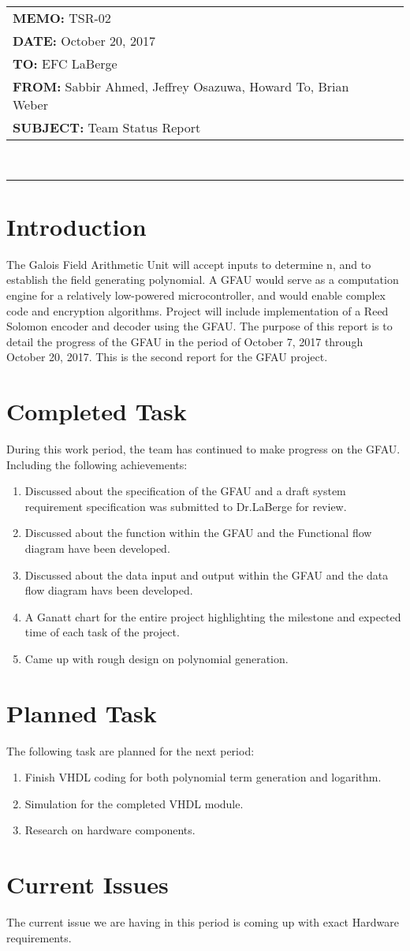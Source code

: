 \documentclass[paper=usletter, fontsize=12pt]{article}
\newcommand{\Sabbir}{Sabbir Ahmed}
\newcommand{\Jeffrey}{Jeffrey Osazuwa}
\newcommand{\Howard}{Howard To}
\newcommand{\Brian}{Brian Weber}
\newcommand{\documentinfo}[5]{
    \begin{centering}
        \parbox{6.8in}{
        \begin{spacing}{1}
            \begin{flushleft}
                \begin{tabular}{l l}
                    #1 \\
                    #2 \\
                    #3 \\
                    #4 \\
                    #5 \\
                \end{tabular} \\
                \rule{\textwidth}{1pt}
            \end{flushleft}
        \end{spacing}
        }
    \end{centering}
}
\begin{document}
\documentinfo{\textbf{MEMO:} TSR-02}{\textbf{DATE: }October 20, 2017}{\textbf{TO: } EFC LaBerge}{\textbf{FROM: }\Sabbir, \Jeffrey, \Howard, \Brian}{\textbf{SUBJECT: } Team Status Report}


\section{Introduction}

The Galois Field Arithmetic Unit will accept inputs to determine n, and to establish the field generating polynomial. A GFAU would serve as a computation engine for a relatively low-powered microcontroller, and would enable complex code and encryption algorithms. Project will include implementation of a Reed Solomon encoder and decoder using the GFAU. The purpose of this report is to detail the progress of the GFAU in the period of October 7, 2017 through October 20, 2017. This is the second report for the GFAU project. 


\section{Completed Task}

During this work period, the team has continued to make progress on the GFAU. Including the following achievements: 

\begin{enumerate}
	\item Discussed about the specification of the GFAU and a draft system requirement specification was submitted to Dr.LaBerge for review.
	\item Discussed about the function within the GFAU and the Functional flow diagram have been developed.
	\item Discussed about the data input and output within the GFAU and the data flow diagram havs been developed.
	\item A Ganatt chart for the entire project highlighting the milestone and expected time of each task of the project.   
	\item Came up with rough design on polynomial generation.
	
\end{enumerate}
\section{Planned Task}
The following task are planned for the next period:

\begin{enumerate}
	\item Finish VHDL coding for both polynomial term generation and logarithm.
	\item Simulation for the completed VHDL module. 
	\item Research on hardware components.
\end{enumerate}

\section{Current Issues}
The current issue we are having in this period is coming up with exact Hardware requirements.  
\end{document}
